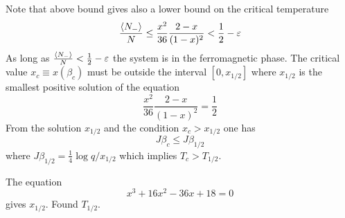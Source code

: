 \documentclass[../main/main.tex]{subfiles}
\begin{document}
Note that above bound gives also a lower bound on the critical temperature
\begin{equation}
    \frac{\expval{N_-} }{N} \le \frac{x^2}{36} \frac{2-x}{(1-x)^2} < \frac{1}{2} - \varepsilon
\end{equation}
As long as \(   \frac{\expval{N_-} }{N}  < \frac{1}{2} - \varepsilon  \) the system is in the ferromagnetic phase. The critical value \( x_c \equiv x (\beta _c) \) must be outside the interval \( [0,x_{1/2}] \) where \( x_{1/2} \)   is the smallest positive solution of the equation
\begin{equation}
  \frac{x^2}{36} \frac{2-x}{(1-x)^2} = \frac{1}{2}
\end{equation}
From the solution \( x_{1/2} \) and the condition \( x_c > x_{1/2} \) one has
\begin{equation}
  J \beta _c \le J \beta_{1/2}
\end{equation}
where \( J \beta _{1/2} = \frac{1}{4} \log{q/x_{1/2}}  \) which implies \(  T_c > T_{1/2} \).
\begin{exercise}{}{}
The equation
\begin{equation}
  x^3 + 16x^2 - 36 x + 18 = 0
\end{equation}
gives \( x_{1/2} \). Found \( T_{1/2} \).
\end{exercise}
\end{document}
